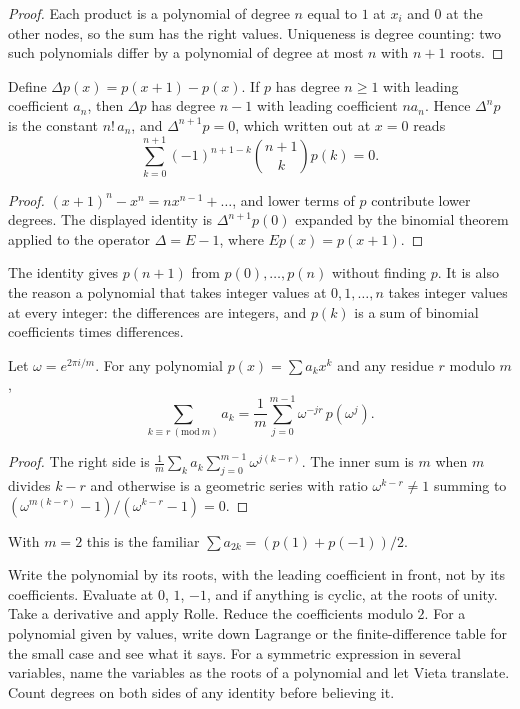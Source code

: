 \begin{proof}
Each product is a polynomial of degree $n$ equal to $1$ at $x_i$ and $0$ at the other nodes, so the sum has the right values. Uniqueness is degree counting: two such polynomials differ by a polynomial of degree at most $n$ with $n + 1$ roots.
\end{proof}

\begin{theorem}
Define $\Delta p(x) = p(x + 1) - p(x)$. If $p$ has degree $n \ge 1$ with leading coefficient $a_n$, then $\Delta p$ has degree $n - 1$ with leading coefficient $n a_n$. Hence $\Delta^n p$ is the constant $n! \, a_n$, and $\Delta^{n+1} p = 0$, which written out at $x = 0$ reads
\[
\sum_{k=0}^{n+1} (-1)^{n+1-k} \binom{n+1}{k} p(k) = 0 .
\]
\end{theorem}

\begin{proof}
$(x+1)^n - x^n = n x^{n-1} + \dots$, and lower terms of $p$ contribute lower degrees. The displayed identity is $\Delta^{n+1} p(0)$ expanded by the binomial theorem applied to the operator $\Delta = E - 1$, where $E p(x) = p(x+1)$.
\end{proof}

The identity gives $p(n+1)$ from $p(0), \dots, p(n)$ without finding $p$. It is also the reason a polynomial that takes integer values at $0, 1, \dots, n$ takes integer values at every integer: the differences are integers, and $p(k)$ is a sum of binomial coefficients times differences.

\begin{theorem}
Let $\omega = e^{2\pi i/m}$. For any polynomial $p(x) = \sum a_k x^k$ and any residue $r$ modulo $m$,
\[
\sum_{k \equiv r \ (\mathrm{mod}\ m)} a_k = \frac{1}{m} \sum_{j=0}^{m-1} \omega^{-jr} \, p(\omega^j) .
\]
\end{theorem}

\begin{proof}
The right side is $\frac1m \sum_k a_k \sum_{j=0}^{m-1} \omega^{j(k-r)}$. The inner sum is $m$ when $m$ divides $k - r$ and otherwise is a geometric series with ratio $\omega^{k-r} \ne 1$ summing to $(\omega^{m(k-r)} - 1)/(\omega^{k-r} - 1) = 0$.
\end{proof}

With $m = 2$ this is the familiar $\sum a_{2k} = (p(1) + p(-1))/2$.

\begin{firstmoves}
Write the polynomial by its roots, with the leading coefficient in front, not by its coefficients. Evaluate at $0$, $1$, $-1$, and if anything is cyclic, at the roots of unity. Take a derivative and apply Rolle. Reduce the coefficients modulo $2$. For a polynomial given by values, write down Lagrange or the finite-difference table for the small case and see what it says. For a symmetric expression in several variables, name the variables as the roots of a polynomial and let Vieta translate. Count degrees on both sides of any identity before believing it.
\end{firstmoves}

